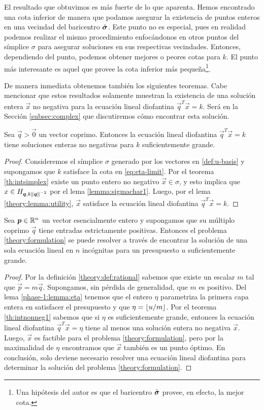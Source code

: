 El resultado que obtuvimos es más fuerte de lo que aparenta. Hemos encontrado una
cota inferior de manera que podamos asegurar la existencia de puntos enteros en una vecindad del
baricentro $\hat{\boldsymbol{ \sigma }}$. Este punto no es especial, pues en realidad podemos realizar el mismo
procedimiento enfocándonos en otros puntos del símplice $\sigma$ para asegurar soluciones en sus
respectivas vecindades. Entonces, dependiendo del punto, podemos obtener mejores o peores cotas para
$k$. El punto más interesante es aquel que provee la cota inferior más pequeña\footnote{
	Una hipótesis del autor es que el baricentro $\hat{\boldsymbol{ \sigma }}$ provee, en efecto, la mejor cota.
}.

De manera inmediata obtenemos también los siguientes teoremas. Cabe mencionar que estos resultados
solamente muestran la existencia de una solución entera $\vec{x}$ no negativa para la ecuación lineal
diofantina $\vec{q}^T\vec{x} = k$. Será en la Sección \ref{subsec:complex} que discutiremos cómo
encontrar esta solución.
\begin{theorem}
	\label{th:intnonneg1}
	Sea $\vec{q} > \vec{0}$ un vector coprimo. Entonces la ecuación lineal diofantina
	$\vec{q}^T\vec{x} = k$ tiene soluciones enteras no negativas para $k$ suficientemente grande.
\end{theorem}
\begin{proof}
	Consideremos el símplice $\sigma$ generado por los vectores en \eqref{def:u-basis} y supongamos
	que $k$ satisface la cota en \eqref{eq:eta-limit}.
	Por el teorema \ref{th:intsimplex} existe un punto entero no negativo $\vec{x} \in \sigma$, y
	esto implica que $x \in H_{\boldsymbol{q}, k\left\lVert \boldsymbol{q} \right\rVert^{-2}}$ por el lema \ref{lemma:sigmachar1}.
	Luego, por el lema \ref{theory:lemma:utility}, $\vec{x}$ satisface la ecuación lineal diofantina
	$\vec{q}^T\vec{x} = k$.
\end{proof}
\begin{theorem}
	\label{th:intnonneg2}
	Sea $\boldsymbol{p} \in \mathbb{R}^n$ un vector esencialmente entero y supongamos que su múltiplo coprimo
	$\vec{q}$ tiene entradas estrictamente positivas. Entonces el problema
	\eqref{theory:formulation} se puede resolver a través de encontrar la solución de una sola
	ecuación lineal en $n$ incógnitas para un presupuesto $u$ suficientemente grande.
\end{theorem}
\begin{proof}
	Por la definición \ref{theory:def:rational} sabemos que existe un escalar $m$ tal que
	$\vec{p} = m\vec{q}$. Supongamos, sin pérdida de generalidad, que $m$ es positivo. Del lema
	\ref{phase-1:lemma:eta} tenemos que el entero $\eta$ parametriza la primera capa entera en
	satisfacer el presupuesto y que $\eta = \left\lfloor u/m \right\rfloor$. Por el teorema \ref{th:intnonneg1} sabemos
	que si $\eta$ es suficientemente grande, entonces la ecuación lineal diofantina
	$\vec{q}^T\vec{x} = \eta$ tiene al menos una solución entera no negativa $\vec{x}$. Luego,
	$\vec{x}$ es factible para el problema \eqref{theory:formulation}, pero por la maximalidad de
	$\eta$ encontramos que $\vec{x}$ también es un punto óptimo. En conclusión, solo deviene
	necesario resolver una ecuación lineal diofantina para determinar la solución del problema
	\eqref{theory:formulation}.
\end{proof}

